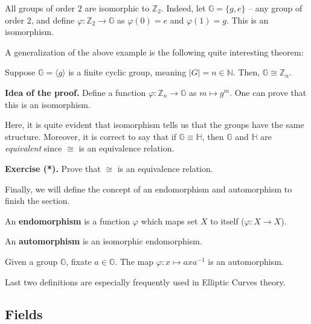\documentclass[../lecture-notes.tex]{subfiles}
\begin{document}
\begin{example}
    All groups of order $2$ are isomorphic to $\mathbb{Z}_2$. Indeed, let $\mathbb{G} = \{g,e\}$ -- any group of order 2, and define $\varphi: \mathbb{Z}_2 \to \mathbb{G}$ as $\varphi(0) = e$ and $\varphi(1) = g$. This is an isomorphism.
\end{example}

A generalization of the above example is the following quite interesting theorem:

\begin{theorem}
    Suppose $\mathbb{G} = \langle g \rangle$ is a finite cyclic group, meaning $|G| = n \in \mathbb{N}$. Then, $\mathbb{G} \cong \mathbb{Z}_n$.
\end{theorem}

\textbf{Idea of the proof.} Define a function $\varphi: \mathbb{Z}_n \to \mathbb{G}$ as $m \mapsto g^m$. One can prove that this is an isomorphism.

Here, it is quite evident that isomorphism tells us that the groups have the same structure. Moreover, it is correct to say that if $\mathbb{G} \equiv \mathbb{H}$, then $\mathbb{G}$ and $\mathbb{H}$ are \textit{equivalent} since $\cong$ is an equivalence relation.

\textbf{Exercise (*).} Prove that $\cong$ is an equivalence relation.

Finally, we will define the concept of an endomorphism and automorphism to finish the section.

\begin{definition}
    An \textbf{endomorphism} is a function $\varphi$ which maps set $X$ to itself ($\varphi: X \to X$).
\end{definition}

\begin{definition}
    An \textbf{automorphism} is an isomorphic endomorphism.
\end{definition}

\begin{example}
    Given a group $\mathbb{G}$, fixate $a \in \mathbb{G}$. The map $\varphi: x \mapsto axa^{-1}$ is an automorphism.
\end{example}

Last two definitions are especially frequently used in Elliptic Curves theory.

\subsection{Fields}
\end{document}
